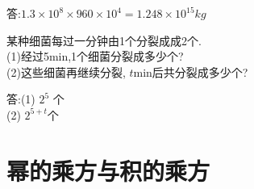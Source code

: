 \documentclass[cn,blue,12pt]{elegantbook}
\begin{document}
\begin{xiti}[resume]
\begin{solution}
        答:\(1.3 \times 10^8 \times 960 \times 10^4 = 1.248 \times 10^{15} kg\)
\end{solution}
\item 某种细菌每过一分钟由1个分裂成成2个.\\
    (1)经过5min,1个细菌分裂成多少个?\\
    (2)这些细菌再继续分裂, \(t\)min后共分裂成多少个?
\begin{solution}
        答:(1) \(2^5\) 个\\
        (2) \(2^{5+t}\)个
\end{solution}
\end{xiti}

\section{幂的乘方与积的乘方}%
\label{sec:幂的乘方与积的乘方}
\end{document}
